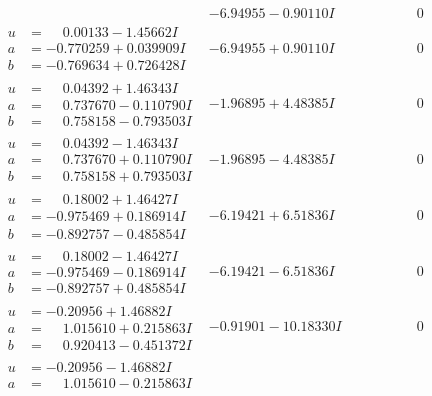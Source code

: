 \documentclass[1p]{elsarticle_modified}
\theoremstyle{definition}
\begin{document}
$$\begin{array}{c|c|c}
 & -6.94955 - 0.90110 I & \phantom{-0.000000 } 0 \\ \hline\begin{aligned}
u &= \phantom{-}0.00133 - 1.45662 I \\
a &= -0.770259 + 0.039909 I \\
b &= -0.769634 + 0.726428 I\end{aligned}
 & -6.94955 + 0.90110 I & \phantom{-0.000000 } 0 \\ \hline\begin{aligned}
u &= \phantom{-}0.04392 + 1.46343 I \\
a &= \phantom{-}0.737670 - 0.110790 I \\
b &= \phantom{-}0.758158 - 0.793503 I\end{aligned}
 & -1.96895 + 4.48385 I & \phantom{-0.000000 } 0 \\ \hline\begin{aligned}
u &= \phantom{-}0.04392 - 1.46343 I \\
a &= \phantom{-}0.737670 + 0.110790 I \\
b &= \phantom{-}0.758158 + 0.793503 I\end{aligned}
 & -1.96895 - 4.48385 I & \phantom{-0.000000 } 0 \\ \hline\begin{aligned}
u &= \phantom{-}0.18002 + 1.46427 I \\
a &= -0.975469 + 0.186914 I \\
b &= -0.892757 - 0.485854 I\end{aligned}
 & -6.19421 + 6.51836 I & \phantom{-0.000000 } 0 \\ \hline\begin{aligned}
u &= \phantom{-}0.18002 - 1.46427 I \\
a &= -0.975469 - 0.186914 I \\
b &= -0.892757 + 0.485854 I\end{aligned}
 & -6.19421 - 6.51836 I & \phantom{-0.000000 } 0 \\ \hline\begin{aligned}
u &= -0.20956 + 1.46882 I \\
a &= \phantom{-}1.015610 + 0.215863 I \\
b &= \phantom{-}0.920413 - 0.451372 I\end{aligned}
 & -0.91901 - 10.18330 I & \phantom{-0.000000 } 0 \\ \hline\begin{aligned}
u &= -0.20956 - 1.46882 I \\
a &= \phantom{-}1.015610 - 0.215863 I \\

\end{aligned}
\end{array}$$
\end{document}
